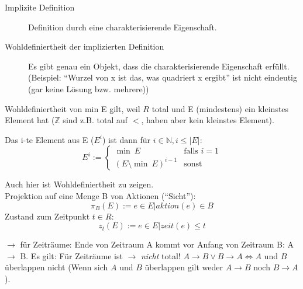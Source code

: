 \begin{description}
	\item[Implizite Definition] Definition durch eine charakterisierende Eigenschaft.
	\item[Wohldefiniertheit der implizierten Definition] Es gibt genau ein Objekt, dass die charakterisierende Eigenschaft erfüllt.
	(Beispiel: "`Wurzel von x ist das, was quadriert x ergibt"' ist nicht eindeutig (gar keine Lösung bzw. mehrere))
\end{description}

Wohldefiniertheit von min E gilt, weil $ R $ total und E (mindestens) ein kleinstes Element hat ($ \mathbb{Z} $ sind z.B. total auf $ < $, haben aber kein kleinstes Element).

Das i-te Element aus E ($ E^i $) ist dann für $ i \in \mathbb{N}, i \leq |E| $:
\begin{equation*}
	E^i := \begin{cases}
		\min \ E & \text{falls } i = 1\\
		(E \setminus{\min \ E})^{i - 1} & \text{sonst}
	\end{cases}
\end{equation*}

Auch hier ist Wohldefiniertheit zu zeigen.\\
Projektion auf eine Menge B von Aktionen ("`Sicht"'):
\begin{equation*}
	\pi_B(E) := e \in E | aktion(e) \in B
\end{equation*}
Zustand zum Zeitpunkt $ t \in R $:
\begin{equation*}
	z_t(E) := e \in E | zeit(e) \leq t %
\end{equation*}

$ \rightarrow $ für Zeiträume: Ende von Zeitraum A kommt vor Anfang von Zeitraum B: A $ \rightarrow $ B. Es gilt: Für Zeiträume ist $ \rightarrow $ \emph{nicht} total!
$ A \rightarrow B \vee B \rightarrow A \Leftrightarrow A $ und $ B $ überlappen nicht (Wenn sich $ A $ und $ B $ überlappen gilt weder $ A  \rightarrow B $ noch $ B \rightarrow A $).

